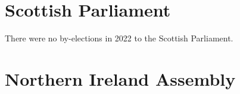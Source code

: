 \documentclass[a4paper,openany]{book}
\begin{document}

\section{Scottish Parliament}

There were no by-elections in 2022 to the Scottish Parliament.

%
%
%

%
%

\section{Northern Ireland Assembly}
\end{document}
